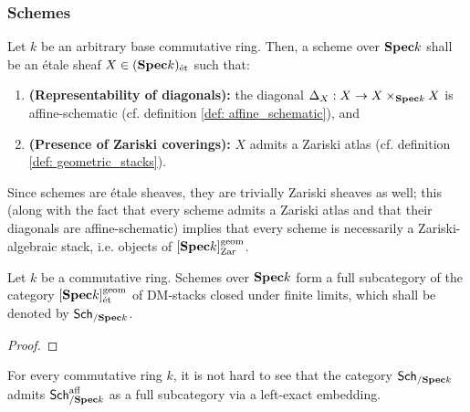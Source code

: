            \subsubsection{Schemes}
                \begin{definition} \label{def: schemes} 
                    Let $k$ be an arbitrary base commutative ring. Then, a scheme over $\mathbf{Spec} k$ shall be an \'etale sheaf $X \in (\mathbf{Spec} k)_{\mathrm{\acute{e}t}}$ such that:
                        \begin{enumerate}
                            \item \textbf{(Representability of diagonals):} the diagonal $\Delta_X: X \to X \x_{\Spec k} X$ is affine-schematic (cf. definition \ref{def: affine_schematic}), and
                            \item \textbf{(Presence of Zariski coverings):} $X$ admits a Zariski atlas (cf. definition \ref{def: geometric_stacks}).
                        \end{enumerate}
                \end{definition}
                \begin{remark} \label{remark: schemes_are_zariski_algebraic_stacks}
                    Since schemes are \'etale sheaves, they are trivially Zariski sheaves as well; this (along with the fact that every scheme admits a Zariski atlas and that their diagonals are affine-schematic) implies that every scheme is necessarily a Zariski-algebraic stack, i.e. objects of $[\mathbf{Spec} k]_{\mathrm{Zar}}^{\mathrm{geom}}$. 
                \end{remark}
                
                \begin{theorem} \label{theorem: scheme_categories} 
                    Let $k$ be a commutative ring. Schemes over $\mathbf{Spec} k$ form a full subcategory of the category $[\mathbf{Spec} k]^{\mathrm{geom}}_{\mathrm{\acute{e}t}}$ of DM-stacks closed under finite limits, which shall be denoted by $\mathsf{Sch}_{/\mathbf{Spec} k}$. 
                \end{theorem}
                    \begin{proof}
                        
                    \end{proof}
                \begin{remark} \label{remark: affine_schemes_are_schemes}
                    For every commutative ring $k$, it is not hard to see that the category $\mathsf{Sch}_{/\mathbf{Spec} k}$ admits $\mathsf{Sch}^{\mathrm{aff}}_{/\mathbf{Spec} k}$ as a full subcategory via a left-exact embedding. 
                \end{remark}
                    
